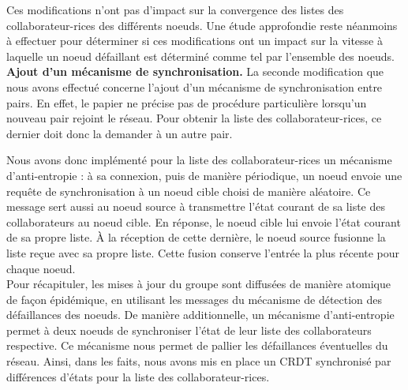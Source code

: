 Ces modifications n'ont pas d'impact sur la convergence des listes des collaborateur-rices des différents noeuds.
Une étude approfondie reste néanmoins à effectuer pour déterminer si ces modifications ont un impact sur la vitesse à laquelle un noeud défaillant est déterminé comme tel par l'ensemble des noeuds.\\

\textbf{Ajout d'un mécanisme de synchronisation.}
La seconde modification que nous avons effectué concerne l'ajout d'un mécanisme de synchronisation entre pairs.
En effet, le papier ne précise pas de procédure particulière lorsqu'un nouveau pair rejoint le réseau.
Pour obtenir la liste des collaborateur-rices, ce dernier doit donc la demander à un autre pair.

Nous avons donc implémenté pour la liste des collaborateur-rices un mécanisme d'anti-entropie : à sa connexion, puis de manière périodique, un noeud envoie une requête de synchronisation à un noeud cible choisi de manière aléatoire.
Ce message sert aussi au noeud source à transmettre l'état courant de sa liste des collaborateurs au noeud cible.
En réponse, le noeud cible lui envoie l'état courant de sa propre liste.
À la réception de cette dernière, le noeud source fusionne la liste reçue avec sa propre liste.
Cette fusion conserve l'entrée la plus récente pour chaque noeud.\\

Pour récapituler, les mises à jour du groupe sont diffusées de manière atomique de façon épidémique, en utilisant les messages du mécanisme de détection des défaillances des noeuds.
De manière additionnelle, un mécanisme d'anti-entropie permet à deux noeuds de synchroniser l'état de leur liste des collaborateurs respective.
Ce mécanisme nous permet de pallier les défaillances éventuelles du réseau.
Ainsi, dans les faits, nous avons mis en place un \ac{CRDT} synchronisé par différences d'états  pour la liste des collaborateur-rices.
